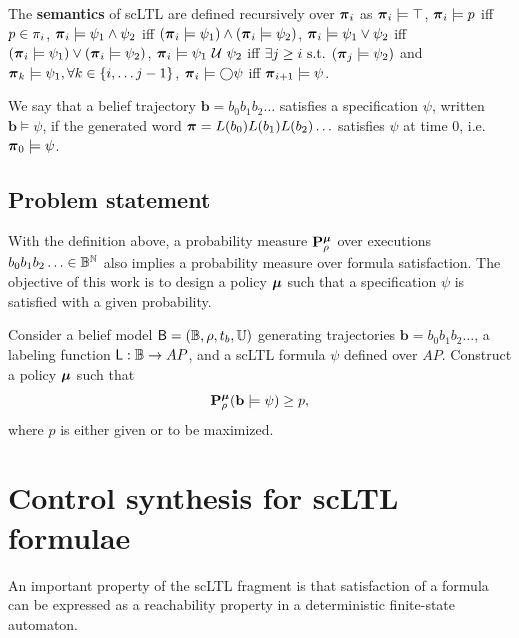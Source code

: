 \documentclass{ifacconf}
\begin{document}
\begin{definition}
 The \textbf{semantics} of scLTL are defined recursively  over ${\boldsymbol{\pi}}_i$ as
    ${\boldsymbol{\pi}}_i \models \top$, 
    ${\boldsymbol{\pi}}_i \models p$ iff $p \in \pi_i$, 
    ${\boldsymbol{\pi}}_i \models \psi_1 \wedge  \psi_2  $ iff $ ( {\boldsymbol{\pi}}_i \models \psi_1 ) \wedge ( {\boldsymbol{\pi}}_i \models \psi_2 ) $, 
    ${\boldsymbol{\pi}}_i \models \psi_1 \vee  \psi_2  $ iff $ ( {\boldsymbol{\pi}}_i \models \psi_1 ) \vee ( {\boldsymbol{\pi}}_i \models \psi_2 ) $, 
    ${\boldsymbol{\pi}}_i \models  \psi_1 \ \mathcal{U}\  \psi_2 $ iff $\exists j \geq i \text{ s.t. } ({\boldsymbol{\pi}}_j \models \psi_2 ) $ and ${\boldsymbol{\pi}}_k \models \psi_1, \forall k \in \{i, \ldots j-1\}$,
    ${\boldsymbol{\pi}}_i \models \bigcirc \psi$ iff ${\boldsymbol{\pi}}_{i+1} \models \psi$.
\end{definition}

We say that a belief trajectory $\mathbf{b} = b_0 b_1 b_2 \ldots$ satisfies a specification $\psi$, written $\mathbf{b} \models \psi$, if the generated word ${\boldsymbol{\pi}} = L(b_0) L(b_1) L(b_2) \ldots$ satisfies $\psi$ at time 0, i.e. ${\boldsymbol{\pi}}_0 \models \psi$. 


\subsection{Problem statement}

With the definition above, a probability measure $\mathbf{P}_\rho^{\boldsymbol{\mu}}$ over executions $b_0 b_1 b_2 \ldots\in \mathbb{B}^{\mathbb N}$ also implies a probability measure over formula satisfaction. The objective of this work is to design a policy ${\boldsymbol{\mu}}$ such that a specification $\psi$ is satisfied with a given probability. 

\begin{problem}
\label{prob:main}
  Consider a belief model $\mathsf{B} = (\mathbb{B}, \rho, t_b, {\mathbb{U}})$ generating trajectories $\mathbf{b} = b_0 b_1 b_2 \ldots$, a labeling function $\mathsf{L} : \mathbb{B} \rightarrow AP$, and a scLTL formula $\psi$ defined over $AP$. Construct a policy ${\boldsymbol{\mu}}$ such that
  \begin{equation}
    \mathbf{P}_\rho^{\boldsymbol{\mu}} ( \mathbf{b} \models \psi )\geq p,
  \end{equation}
  where $p$ is either given or to be maximized.
\end{problem}


\section{Control synthesis for scLTL formulae}
\label{sec:exact_synth}

An important property of the scLTL fragment is that satisfaction of a formula can be expressed as a reachability property in a deterministic finite-state automaton.
\end{document}

